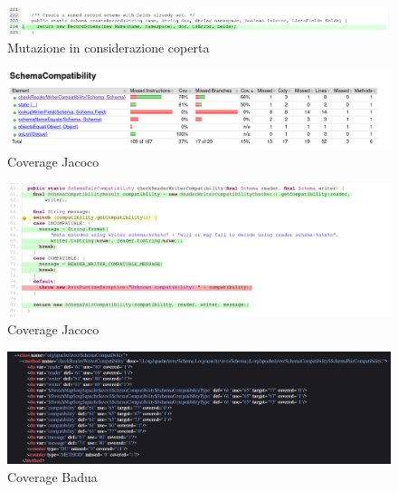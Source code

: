 \documentclass[12pt, a4paper]{article}
\begin{document}
  \begin{figure}
    \includegraphics[width=\linewidth]{./images/create_record/PitCoverage6.png}
    \caption{Mutazione in considerazione coperta}
    \label{fig:PitMutationCreateRecord6}
  \end{figure}

  \begin{figure}
    \includegraphics[width=\linewidth]{./images/schema_compatibiity/JacocoCoverage1.png}
    \caption{Coverage Jacoco}
    \label{fig:JacocoCoverageSchemaCompatibility1}
  \end{figure}

  \begin{figure}
    \includegraphics[width=\linewidth]{./images/schema_compatibiity/JacocoCoverage2.png}
    \caption{Coverage Jacoco}
    \label{fig:JacocoCoverageSchemaCompatibility2}
  \end{figure}

  \begin{figure}
    \includegraphics[width=\linewidth]{./images/schema_compatibiity/BaduaCoverage1.png}
    \caption{Coverage Badua}
    \label{fig:BaduaCoverageSchemaCompatibility1}
  \end{figure}
\end{document}
